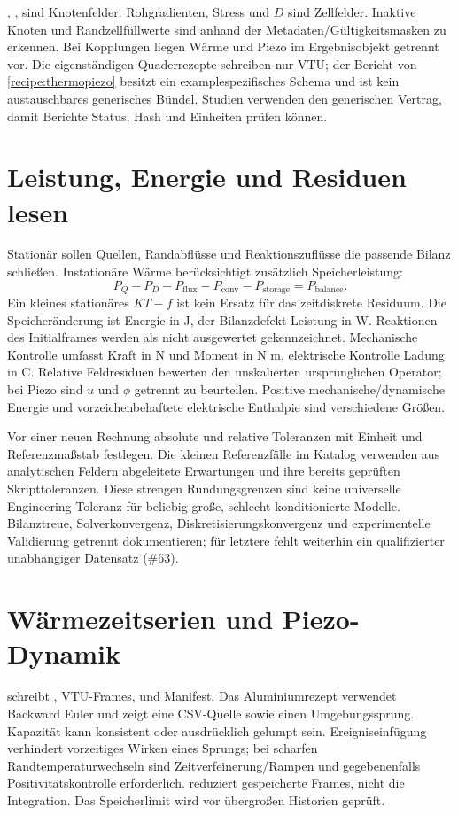 , ,  sind
Knotenfelder. Rohgradienten, Stress und $D$ sind Zellfelder. Inaktive Knoten
und Randzellfüllwerte sind anhand der Metadaten/Gültigkeitsmasken zu erkennen.
Bei Kopplungen liegen Wärme und Piezo im Ergebnisobjekt getrennt vor.
Die eigenständigen Quaderrezepte schreiben nur VTU; der Bericht von
\ref{recipe:thermopiezo} besitzt ein examplespezifisches Schema und ist
kein austauschbares generisches Bündel. Studien verwenden den generischen
Vertrag, damit Berichte Status, Hash und Einheiten prüfen können.

\section{Leistung, Energie und Residuen lesen}
Stationär sollen Quellen, Randabflüsse und Reaktionszuflüsse die passende
Bilanz schließen. Instationäre Wärme berücksichtigt zusätzlich Speicherleistung:
\[
 P_Q+P_D-P_{\mathrm{flux}}-P_{\mathrm{conv}}-P_{\mathrm{storage}}
 =P_{\mathrm{balance}}.
\]
Ein kleines stationäres $KT-f$ ist kein Ersatz für das zeitdiskrete Residuum.
Die Speicheränderung ist Energie in J, der Bilanzdefekt Leistung in W.
Reaktionen des Initialframes werden als nicht ausgewertet gekennzeichnet.
Mechanische Kontrolle umfasst Kraft in N und Moment in N m,
elektrische Kontrolle Ladung in C. Relative Feldresiduen bewerten den
unskalierten ursprünglichen Operator; bei Piezo sind $u$ und $\phi$ getrennt
zu beurteilen. Positive mechanische/dynamische Energie und vorzeichenbehaftete
elektrische Enthalpie sind verschiedene Größen.

Vor einer neuen Rechnung absolute und relative Toleranzen mit Einheit und
Referenzmaßstab festlegen. Die kleinen Referenzfälle im Katalog verwenden
aus analytischen Feldern abgeleitete Erwartungen und ihre bereits geprüften
Skripttoleranzen. Diese strengen Rundungsgrenzen sind keine universelle
Engineering-Toleranz für beliebig große, schlecht konditionierte Modelle.
Bilanztreue, Solverkonvergenz, Diskretisierungskonvergenz und experimentelle
Validierung getrennt dokumentieren; für letztere fehlt weiterhin ein
qualifizierter unabhängiger Datensatz (\#63).

\section{Wärmezeitserien und Piezo-Dynamik}
 schreibt , VTU-Frames,
 und Manifest. Das Aluminiumrezept verwendet Backward Euler
und zeigt eine CSV-Quelle sowie einen Umgebungssprung. Kapazität kann
konsistent oder ausdrücklich gelumpt sein. Ereigniseinfügung verhindert
vorzeitiges Wirken eines Sprungs; bei scharfen Randtemperaturwechseln sind
Zeitverfeinerung/Rampen und gegebenenfalls Positivitätskontrolle erforderlich.
 reduziert gespeicherte Frames, nicht die Integration.
Das Speicherlimit wird vor übergroßen Historien geprüft.

